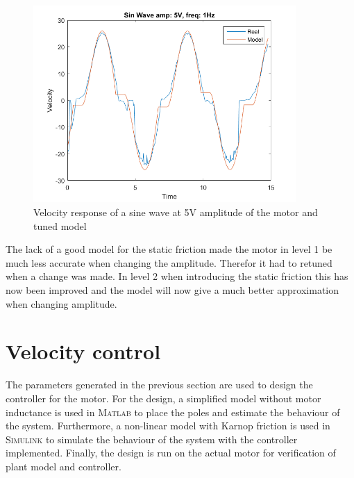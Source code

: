 \documentclass[12pt,a4paper]{article}
\begin{document}
\begin{figure}[H]
    \centering
    \includegraphics[width=100mm]{l2_sin_a5_f1.png}
    \caption{Velocity response of a sine wave at 5V amplitude of the
    motor and tuned model}
    \label{fig:l2_sin_a5_f1}
\end{figure} 
The lack of a good model for the static friction made the
motor in level 1 be much less accurate when changing the amplitude.
Therefor it had to retuned when a change was made. In level 2 when
introducing the static friction this has now been improved and the model
will now give a much better approximation when changing amplitude.
\section*{Velocity control}
\label{sec:velocity_control}
The parameters generated in the previous section are used to design the
controller for the motor. For the design, a simplified model without motor
inductance is used in \textsc{Matlab} to place the poles and estimate the
behaviour of the system. Furthermore, a non-linear model with Karnop friction is
used in \textsc{Simulink} to simulate the behaviour of the system with the
controller implemented. Finally, the design is run on the actual motor for
verification of plant model and controller.
\end{document}

